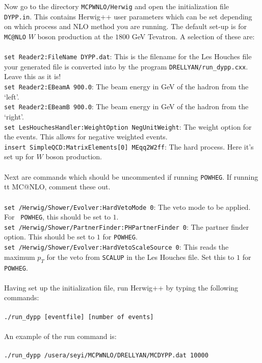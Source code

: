\documentclass[12pt,a4paper,oneside]{article}
\begin{document}
{Now go to the directory {\tt MCPWNLO/Herwig} and open the initialization file {\tt
  DYPP.in}. This contains \textsf{Herwig++} user parameters which can be set depending on
which process and NLO method you are running. The default set-up is for {\tt MC@NLO} $W$
boson production at the $1800$ GeV Tevatron. A selection of these are:\\
\\
{\tt set Reader2:FileName DYPP.dat}: This is the filename for the Les Houches file your
generated file is converted into by the program {\tt DRELLYAN/run\_dypp.cxx}. Leave this
as it is! \\
{\tt set Reader2:EBeamA 900.0}: The beam energy in GeV of the hadron from the `left'. \\
{\tt set Reader2:EBeamB 900.0}: The beam energy in GeV of the hadron from the `right'.\\
{\tt set LesHouchesHandler:WeightOption NegUnitWeight}: The weight option for the
events. This allows for negative weighted events. \\
{\tt insert SimpleQCD:MatrixElements[0] MEqq2W2ff}: The hard process. Here it's set up for
$W$ boson production.\\
\\
Next are commands which should be uncommented if running {\tt POWHEG}. If running {\\
tt MC@NLO}, comment these out. \\
\\
{\tt set /Herwig/Shower/Evolver:HardVetoMode 0}: The veto mode to be applied. For {\tt
  POWHEG}, this should be set to $1$.\\
{\tt set /Herwig/Shower/PartnerFinder:PHPartnerFinder 0}: The partner finder option. This
should be set to $1$ for {\tt POWHEG}.\\
{\tt set /Herwig/Shower/Evolver:HardVetoScaleSource 0}: This reads the maximum $p_T$ for
the veto from {\tt SCALUP} in the Les Houches file. Set this to $1$ for {\tt POWHEG}.\\
\\
Having set up the initialization file, run \textsf{Herwig++} by typing the following
commands: \\
\\
{\tt ./run\_dypp [eventfile] [number of events]} \\
\\
An example of the run
command is:\\
\\
{\tt ./run\_dypp /usera/seyi/MCPWNLO/DRELLYAN/MCDYPP.dat 10000}\\
}
\end{document}
